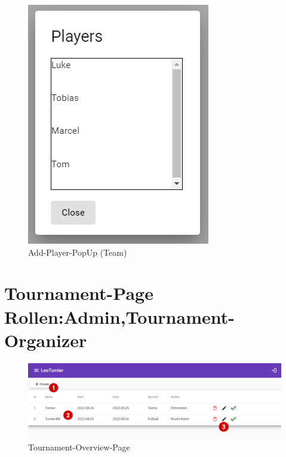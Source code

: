 \begin{figure}[H]
    \includegraphics[scale=0.5]{pics/user-guide/add-player.PNG}
    \caption{Add-Player-PopUp (Team)}
\end{figure}

\newpage
\section{Tournament-Page Rollen:Admin,Tournament-Organizer}
\begin{figure}[H]
    \includegraphics[scale=0.4]{pics/user-guide/tournament-overview-page.PNG}
    \caption{Tournament-Overview-Page}
\end{figure}

